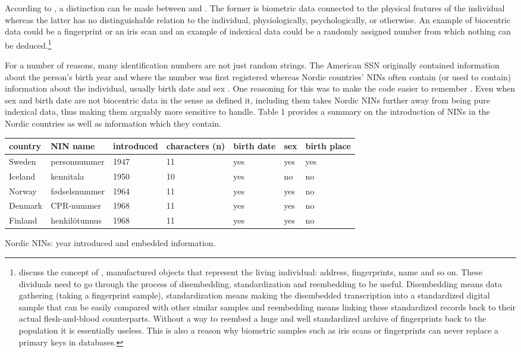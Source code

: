 According to \citet{Alterman2003}, a distinction can be made between  and . The former is biometric data connected to the physical features of the individual whereas the latter has no distinguishable relation to the individual, physiologically, psychologically, or otherwise. An example of biocentric data could be a fingerprint or an iris scan and an example of indexical data could be a randomly assigned number from which nothing can be deduced.\footnote{\citet{brensinger2021} discuss the concept of , manufactured objects that represent the living individual: address, fingerprints, name and so on. These dividuals need to go through the process of disembedding, standardization and reembedding to be useful. Disembedding means data gathering (taking a fingerprint sample), standardization means making the disembedded transcription into a standardized digital sample that can be easily compared with other similar samples and reembedding means linking these standardized records back to their actual flesh-and-blood counterparts. Without a way to reembed a huge and well standardized archive of fingerprints back to the population it is essentially useless. This is also a reason why biometric samples such as iris scans or fingerprints can never replace a primary keys in databases.}

For a number of reasons, many identification numbers are not just random strings. The American SSN originally contained information about the person's birth year and where the number was first registered \citep[32]{brensinger2021} whereas Nordic countries' NINs often contain (or used to contain) information about the individual, usually birth date and sex \citep{watson2010, salste2021}. One reasoning for this was to make the code easier to remember \citep{alastalo2022}. Even when sex and birth date are not biocentric data in the sense as \citep{Alterman2003} defined it, including them takes Nordic NINs further away from being pure indexical data, thus making them arguably more sensitive to handle. Table 1 provides a summary on the introduction of NINs in the Nordic countries as well as information which they contain.

\begin{widetable}[ht]
\centering
\begin{tabular}{lllllll}
\toprule
  country & NIN name & introduced & characters (n) & birth date & sex & birth place \\
  \hline
  Sweden & personnummer & 1947 & 11 & yes & yes & yes\\
  Iceland & kennitala & 1950 & 10 & yes & no & no \\
  Norway & fødselsnummer & 1964 & 11 & yes & yes & no \\
  Denmark & CPR-nummer & 1968 & 11 & yes & yes & no \\
  Finland & henkilötunnus & 1968 & 11 & yes & yes & no \\
\bottomrule
\end{tabular}
\caption{Nordic NINs: year introduced and embedded information.}
\label{tab:nordiccomparison}
\end{widetable}

